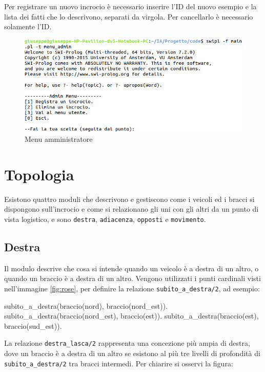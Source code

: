 Per registrare un nuovo incrocio è necessario inserire l'ID del nuovo esempio e la lista dei fatti che lo descrivono, separati da virgola. Per cancellarlo è necessario solamente l'ID.

\begin{figure}[!hbtp]
	\includegraphics[width=\textwidth]{images/shell/admin}
	\caption{Menu amministratore}
\end{figure}

\section{Topologia}
Esistono quattro moduli che descrivono e gestiscono come i veicoli ed i bracci si dispongono sull'incrocio e come si relazionano gli uni con gli altri da un punto di vista logistico, e sono \texttt{destra}, \texttt{adiacenza}, \texttt{opposti} e \texttt{movimento}.

\subsection{Destra}
\label{ssec:right}
Il modulo descrive che cosa si intende quando un veicolo è a destra di un altro, o quando un braccio è a destra di un altro. Vengono utilizzati i punti cardinali visti nell'immagine \ref{fig:rose}, per definire la relazione \texttt{subito\_a\_destra/2}, ad esempio:
\begin{verbatimtab}
subito_a_destra(braccio(nord), braccio(nord_est)).
subito_a_destra(braccio(nord_est), braccio(est)).
subito_a_destra(braccio(est), braccio(sud_est)).	
\end{verbatimtab}

La relazione \texttt{destra\_lasca/2} rappresenta una concezione più ampia di destra, dove un braccio è a destra di un altro se esistono al più tre livelli di profondità di \texttt{subito\_a\_destra/2} tra bracci intermedi. Per chiarire si osservi la figura:

